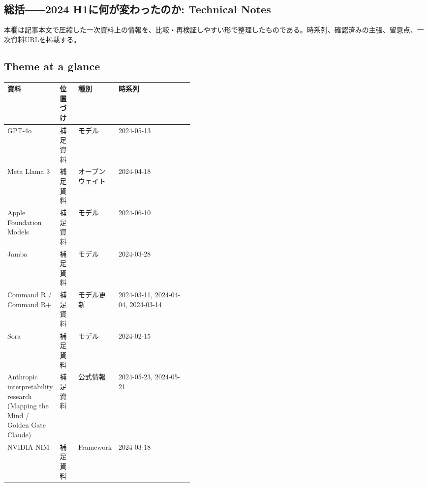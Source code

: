 \subsection*{総括――2024 H1に何が変わったのか: Technical Notes}
本欄は記事本文で圧縮した一次資料上の情報を、比較・再検証しやすい形で整理したものである。時系列、確認済みの主張、留意点、一次資料URLを掲載する。
\medskip
\subsection*{Theme at a glance}
\begin{center}
\footnotesize
\begin{tabularx}{\linewidth}{@{}p{0.20\linewidth}p{0.10\linewidth}p{0.14\linewidth}X@{}}
\toprule
資料 & 位置づけ & 種別 & 時系列 \\
\midrule
GPT-4o & 補足資料 & モデル & 2024-05-13   \\
Meta Llama 3 & 補足資料 & オープンウェイト & 2024-04-18   \\
Apple Foundation Models & 補足資料 & モデル & 2024-06-10   \\
Jamba & 補足資料 & モデル & 2024-03-28   \\
Command R / Command R+ & 補足資料 & モデル更新 & 2024-03-11, 2024-04-04, 2024-03-14   \\
Sora & 補足資料 & モデル & 2024-02-15   \\
Anthropic interpretability research (Mapping the Mind / Golden Gate Claude) & 補足資料 & 公式情報 & 2024-05-23, 2024-05-21   \\
NVIDIA NIM & 補足資料 & Framework & 2024-03-18   \\
\bottomrule
\end{tabularx}
\end{center}
\normalsize

